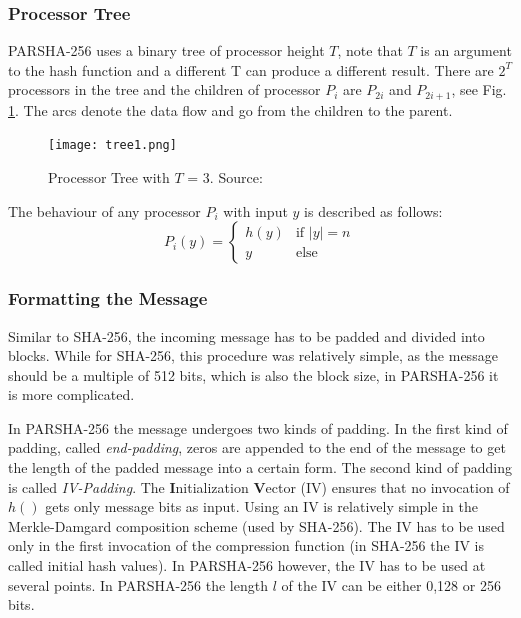 \documentclass[letterpaper]{article}
\begin{document}
\subsubsection{Processor Tree}
PARSHA-256 uses a binary tree of processor height $T$, note that $T$ is an argument to the hash function and a different T can produce a different result. There are $2^T$ processors in the tree and the children of processor $P_i$ are $P_{2i}$ and $P_{2i+1}$, see Fig. \ref{fig:tree1}. The arcs denote the data flow and go from the children to the parent. 

\begin{figure}[h!]
\begin{center}

 \texttt{[image: tree1.png]}
 \end{center}


  \caption{Processor Tree with $T$ = 3. Source: \cite{parsha256}}
  \label{fig:tree1}
\end{figure} 

The behaviour of any processor $P_i$ with input $y$ is described as follows:
\begin{equation}\label{eq_proc}
P_i(y) = \begin{cases}
h(y) & \text{if } |y| = n \\
y & \text{else}
\end{cases}
\end{equation}

\subsubsection{Formatting the Message}
Similar to SHA-256, the incoming message has to be padded and divided into blocks. While for SHA-256, this procedure was relatively simple, as the message should be a multiple of 512 bits, which is also the block size, in PARSHA-256 it is more complicated.

In PARSHA-256 the message undergoes two kinds of padding. In the first kind of padding, called \emph{end-padding}, zeros are appended to the end of the message to get the length of the padded message into a certain form. The second kind of padding is called \emph{IV-Padding}. The \textbf{I}nitialization \textbf{V}ector (IV) ensures that no invocation of $h()$ gets only message bits as input. Using an IV is relatively simple in the Merkle-Damgard composition scheme (used by SHA-256). The IV has to be used only in the first invocation of the compression function (in SHA-256 the IV is called initial hash values). In PARSHA-256 however, the IV has to be used at several points. In PARSHA-256 the length $l$ of the IV can be either 0,128 or 256 bits.
\end{document}
